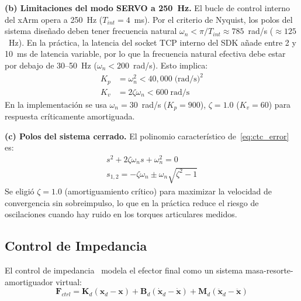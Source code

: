 \documentclass[journal,10pt,twoside]{IEEEtran}
\begin{document}
\textbf{(b) Limitaciones del modo SERVO a 250~Hz.}
El bucle de control interno del xArm opera a 250~Hz
($T_{int} = 4$~ms). Por el criterio de Nyquist, los polos del sistema
diseñado deben tener frecuencia natural $\omega_n < \pi/T_{int}
\approx 785$~rad/s ($\approx 125$~Hz). En la práctica, la latencia
del socket TCP interno del SDK añade entre 2 y 10~ms de latencia
variable, por lo que la frecuencia natural efectiva debe estar por
debajo de 30--50~Hz ($\omega_n < 200$~rad/s). Esto implica:
\begin{align*}
  K_p &= \omega_n^2 < 40{,}000 \;\text{(rad/s)}^2 \\
  K_v &= 2\zeta\omega_n < 600 \;\text{rad/s}
\end{align*}
En la implementación se usa $\omega_n = 30$~rad/s
($K_p = 900$), $\zeta = 1.0$ ($K_v = 60$) para respuesta
críticamente amortiguada.

\textbf{(c) Polos del sistema cerrado.}
El polinomio característico de~\eqref{eq:ctc_error} es:
\begin{gather*}
  s^2 + 2\zeta\omega_n s + \omega_n^2 = 0 \\
  s_{1,2} = -\zeta\omega_n \pm \omega_n\sqrt{\zeta^2 - 1}
\end{gather*}
Se eligió $\zeta = 1.0$ (amortiguamiento crítico) para maximizar
la velocidad de convergencia sin sobreimpulso, lo que en la
práctica reduce el riesgo de oscilaciones cuando hay ruido en los
torques articulares medidos.


\subsection{Control de Impedancia}

El control de impedancia~\cite{hogan1985} modela el efector final como
un sistema masa-resorte-amortiguador virtual:
\begin{equation}
  \bm{F}_{ctrl} = \bm{K}_d(\bm{x}_d - \bm{x})
                + \bm{B}_d(\dot{\bm{x}}_d - \dot{\bm{x}})
                + \bm{M}_d(\ddot{\bm{x}}_d - \ddot{\bm{x}})
  \label{eq:impedance}
\end{equation}
\end{document}
